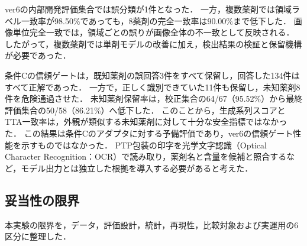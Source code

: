 \documentclass[uplatex,dvipdfmx]{jsarticle}
\begin{document}
ver6の内部開発評価集合では誤分類が1件となった．
一方，複数薬剤では領域ラベル一致率が98.50\%であっても，8薬剤の完全一致率は90.00\%まで低下した．
画像単位完全一致では，領域ごとの誤りが画像全体の不一致として反映される．
したがって，複数薬剤では単剤モデルの改善に加え，検出結果の検証と保留機構が必要であった．

条件Cの信頼ゲートは，既知薬剤の誤回答3件をすべて保留し，回答した134件はすべて正解であった．
一方で，正しく識別できていた11件も保留し，未知薬剤8件を危険通過させた．
未知薬剤保留率は，校正集合の64/67（95.52\%）から最終評価集合の50/58（86.21\%）へ低下した．
このことから，生成系列スコアとTTA一致率は，外観が類似する未知薬剤に対して十分な安全指標ではなかった．
この結果は条件Cのアダプタに対する予備評価であり，ver6の信頼ゲート性能を示すものではなかった．
PTP包装の印字を光学文字認識（Optical Character Recognition：OCR）で読み取り，薬剤名と含量を候補と照合するなど，モデル出力とは独立した根拠を導入する必要があると考えた．

\subsection{妥当性の限界}

本実験の限界を，データ，評価設計，統計，再現性，比較対象および実運用の6区分に整理した．
\end{document}
